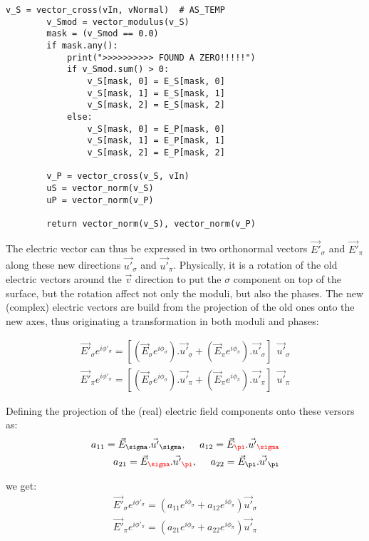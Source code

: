 \documentclass{iucr}
\newcommand{\inred}[1]{{\color{red}#1}}
\begin{document}
\begin{lstlisting}[caption={Method of {\tt S4Beam} to compute the local directions $\sigma$ and $\pi$ at the beamline element.}, label={lst:localsigmaandpi}, captionpos=b]
        v_S = vector_cross(vIn, vNormal)  # AS_TEMP
        v_Smod = vector_modulus(v_S)
        mask = (v_Smod == 0.0)
        if mask.any():
            print(">>>>>>>>>> FOUND A ZERO!!!!!")
            if v_Smod.sum() > 0:
                v_S[mask, 0] = E_S[mask, 0]
                v_S[mask, 1] = E_S[mask, 1]
                v_S[mask, 2] = E_S[mask, 2]
            else:
                v_S[mask, 0] = E_P[mask, 0]
                v_S[mask, 1] = E_P[mask, 1]
                v_S[mask, 2] = E_P[mask, 2]

        v_P = vector_cross(v_S, vIn)
        uS = vector_norm(v_S)
        uP = vector_norm(v_P)

        return vector_norm(v_S), vector_norm(v_P)
\end{lstlisting}




The electric vector can thus be expressed in two orthonormal vectors $\vec{E'}_\sigma$ and $\vec{E'}_\pi$ along these 
new directions $\vec{u'}_\sigma$ and $\vec{u'}_\pi$. Physically, it is a rotation of the old electric vectors around
the $\vec{v}$ direction to put the $\sigma$ component on top of the surface, but the rotation affect not only the 
moduli, but also the phases. The new (complex) electric vectors are build from the projection of the old ones onto the
new axes, thus originating a transformation in both moduli and phases:

\begin{eqnarray}
\vec{E'}_\sigma e^{i \phi'_\sigma} = [(\vec{E}_\sigma e^{i \phi_\sigma}).\vec{u'}_\sigma + (\vec{E}_\pi e^{i \phi_\pi}).\vec{u'}_\sigma ] 
  ~~\vec{u'}_\sigma  \\ 
\vec{E'}_\pi e^{i \phi'_\pi} = [(\vec{E}_\sigma e^{i \phi_\sigma}).\vec{u'}_\pi + (\vec{E}_\pi e^{i \phi_\pi}).\vec{u'}_\pi ] 
  ~~\vec{u'}_\pi 
\end{eqnarray}


Defining the projection of the (real) electric field components onto these versors as: 
\begin{eqnarray}
a_{11} = \vec{E}_\sigma . \vec{u'}_\sigma, ~~~~ 
a_{12} = \vec{E}_\inred{\pi} . \vec{u'}_\inred{\sigma} \nonumber \\
a_{21} = \vec{E}_\inred{\sigma} . \vec{u'}_\inred{\pi}, ~~~~
a_{22} = \vec{E}_\pi . \vec{u'}_\pi 
\end{eqnarray}

we get:
\begin{eqnarray}
\label{withphases}
\vec{E'}_\sigma e^{i \phi'_\sigma} = (a_{11} e^{i \phi_\sigma} + a_{12} e^{i \phi_\pi}) \vec{u'}_\sigma \nonumber \\ 
\vec{E'}_\pi e^{i \phi'_\pi} =    (a_{21} e^{i \phi_\sigma} + a_{22} e^{i \phi_\pi}) \vec{u'}_\pi
\end{eqnarray}
\end{document}
